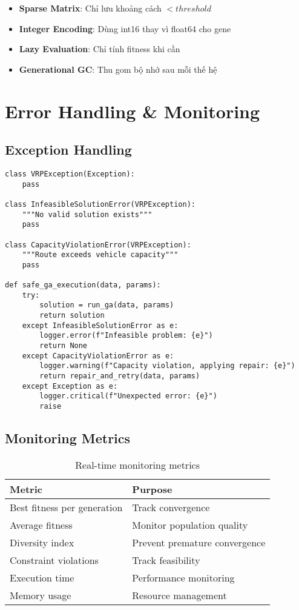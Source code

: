 \documentclass[12pt,a4paper]{article}
\begin{document}
\begin{itemize}
    \item \textbf{Sparse Matrix}: Chỉ lưu khoảng cách $< threshold$
    \item \textbf{Integer Encoding}: Dùng int16 thay vì float64 cho gene
    \item \textbf{Lazy Evaluation}: Chỉ tính fitness khi cần
    \item \textbf{Generational GC}: Thu gom bộ nhớ sau mỗi thế hệ
\end{itemize}

\section{Error Handling \& Monitoring}

\subsection{Exception Handling}

\begin{verbatim}
class VRPException(Exception):
    pass

class InfeasibleSolutionError(VRPException):
    """No valid solution exists"""
    pass

class CapacityViolationError(VRPException):
    """Route exceeds vehicle capacity"""
    pass

def safe_ga_execution(data, params):
    try:
        solution = run_ga(data, params)
        return solution
    except InfeasibleSolutionError as e:
        logger.error(f"Infeasible problem: {e}")
        return None
    except CapacityViolationError as e:
        logger.warning(f"Capacity violation, applying repair: {e}")
        return repair_and_retry(data, params)
    except Exception as e:
        logger.critical(f"Unexpected error: {e}")
        raise
\end{verbatim}

\subsection{Monitoring Metrics}

\begin{table}[h]
\centering
\begin{tabular}{@{}ll@{}}
\toprule
\textbf{Metric} & \textbf{Purpose} \\ \midrule
Best fitness per generation & Track convergence \\
Average fitness & Monitor population quality \\
Diversity index & Prevent premature convergence \\
Constraint violations & Track feasibility \\
Execution time & Performance monitoring \\
Memory usage & Resource management \\ \bottomrule
\end{tabular}
\caption{Real-time monitoring metrics}
\end{table}
\end{document}
